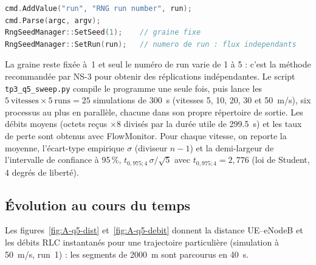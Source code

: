 \begin{lstlisting}[language=C++]
cmd.AddValue("run", "RNG run number", run);
cmd.Parse(argc, argv);
RngSeedManager::SetSeed(1);    // graine fixe
RngSeedManager::SetRun(run);   // numero de run : flux independants
\end{lstlisting}

La graine reste fixée à~1 et seul le numéro de run varie de 1 à 5 : c'est la
méthode recommandée par NS-3 pour obtenir des réplications indépendantes. Le
script \texttt{tp3\_q5\_sweep.py} compile le programme une seule fois, puis
lance les $5\ \text{vitesses}\times 5\ \text{runs}=25$ simulations de
\SI{300}{s} (vitesses 5, 10, 20, 30 et \SI{50}{m/s}), six processus au plus en
parallèle, chacune dans son propre répertoire de sortie. Les débits moyens
(octets reçus $\times 8$ divisés par la durée utile de \SI{299.5}{s}) et les
taux de perte sont obtenus avec FlowMonitor. Pour chaque vitesse, on reporte la
moyenne, l'écart-type empirique $\sigma$ (diviseur $n-1$) et la demi-largeur de
l'intervalle de confiance à 95\,\%, $t_{0{,}975;4}\,\sigma/\sqrt{5}$ avec
$t_{0{,}975;4}=2{,}776$ (loi de Student, 4 degrés de liberté).

\subsection{Évolution au cours du temps}

Les figures~\ref{fig:A-q5-dist} et~\ref{fig:A-q5-debit} donnent la distance
UE--eNodeB et les débits RLC instantanés pour une trajectoire particulière
(simulation à \SI{50}{m/s}, run~1) : les segments de \SI{2000}{m} sont
parcourus en \SI{40}{s}.




